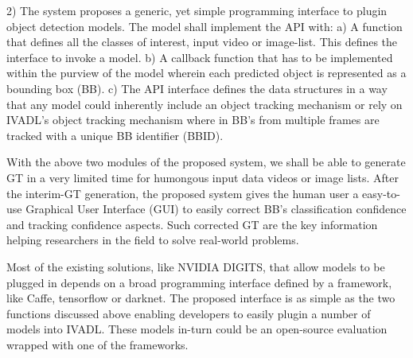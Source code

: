 \documentclass[conference]{IEEEtran}
\begin{document}
2) The system proposes a generic, yet simple programming interface to plugin object detection models. The model shall implement the API with:
a) A function that defines all the classes of interest, input video or image-list. This defines the interface to invoke a model.
b) A callback function that has to be implemented within the purview of the model wherein each predicted object is represented as a bounding box (BB).
c) The API interface defines the data structures in a way that any model could inherently include an object tracking mechanism or rely on IVADL's object tracking mechanism where in BB's from multiple frames are tracked with a unique BB identifier (BBID).

With the above two modules of the proposed system, we shall be able to generate GT in a very limited time for humongous input data videos or image lists. After the interim-GT generation, the proposed system gives the human user a easy-to-use Graphical User Interface (GUI) to easily correct BB's classification confidence and tracking confidence aspects. Such corrected GT are the key information helping researchers in the field to solve real-world problems. 

Most of the existing solutions, like NVIDIA DIGITS, that allow models to be plugged in depends on a broad programming interface defined by a framework, like Caffe, tensorflow or darknet. The proposed interface is as simple as the two functions discussed above enabling developers to easily plugin a number of models into IVADL. These models in-turn could be an open-source evaluation wrapped with one of the frameworks. 
\end{document}
